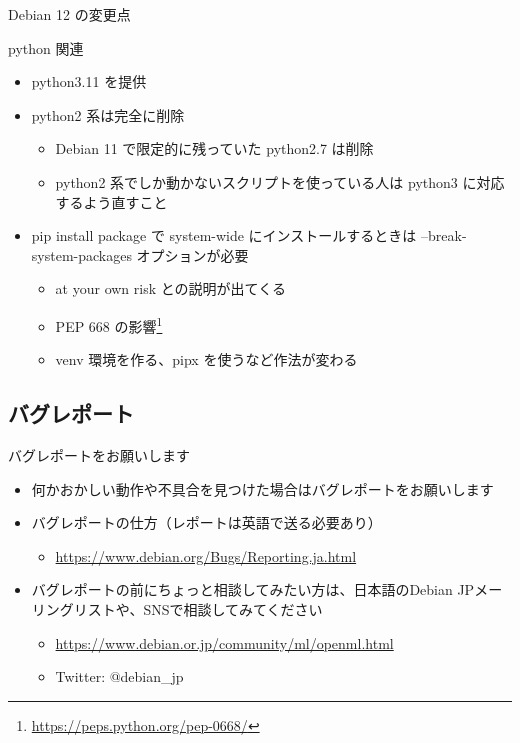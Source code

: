 \begin{frame}{Debian 12 の変更点}%

python 関連

\begin{itemize}
\item python3.11 を提供
\item python2 系は完全に削除
  \begin{itemize}
  \item Debian 11 で限定的に残っていた python2.7 は削除
  \item python2 系でしか動かないスクリプトを使っている人は python3 に対応するよう直すこと
  \end{itemize}
\item pip install package で system-wide にインストールするときは --break-system-packages オプションが必要
  \begin{itemize}
  \item at your own risk との説明が出てくる
  \item PEP 668 の影響\footnote{\url{https://peps.python.org/pep-0668/}}
  \item venv 環境を作る、pipx を使うなど作法が変わる
  \end{itemize}
\end{itemize}

\end{frame}


\subsection{バグレポート}

\begin{frame}{バグレポートをお願いします}%
  \begin{itemize}
  \item 何かおかしい動作や不具合を見つけた場合はバグレポートをお願いします
  \item バグレポートの仕方（レポートは英語で送る必要あり）
    \begin{itemize}
    \item \url{https://www.debian.org/Bugs/Reporting.ja.html}
    \end{itemize}
  \item バグレポートの前にちょっと相談してみたい方は、日本語のDebian JPメーリングリストや、SNSで相談してみてください
    \begin{itemize}
    \item \url{https://www.debian.or.jp/community/ml/openml.html}
    \item Twitter: @debian\_jp
    \end{itemize}
  \end{itemize}
\end{frame}

